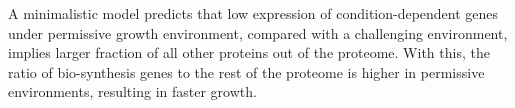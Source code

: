 \label{fig:model}
A minimalistic model predicts that low expression of condition-dependent genes under permissive growth environment, compared with a challenging environment, implies larger fraction of all other proteins out of the proteome.
With this, the ratio of bio-synthesis genes to the rest of the proteome is higher in permissive environments, resulting in faster growth.

